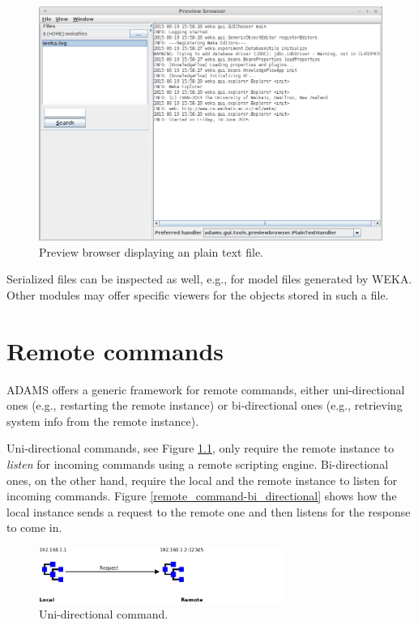 \begin{figure}[htb]
  \centering
  \includegraphics[width=12.0cm]{images/previewbrowser-plaintext1.png}
  \caption{Preview browser displaying an plain text file.}
  \label{previewbrowser-plaintext1}
\end{figure}

Serialized files can be inspected as well, e.g., for model files generated 
by WEKA. Other modules may offer specific viewers for the objects stored
in such a file.


\chapter{Remote commands}

ADAMS offers a generic framework for remote commands, either uni-directional
ones (e.g., restarting the remote instance) or bi-directional ones
(e.g., retrieving system info from the remote instance).

Uni-directional commands, see Figure \ref{remote_command-uni_directional},
only require the remote instance to \textit{listen} for incoming commands
using a remote scripting engine. Bi-directional ones, on the other hand,
require the local and the remote instance to listen for incoming commands.
Figure \ref{remote_command-bi_directional} shows how the local instance
sends a request to the remote one and then listens for the response to
come in.

\begin{figure}[htb]
  \centering
  \includegraphics[width=8.0cm]{images/remote_command-uni_directional.png}
  \caption{Uni-directional command.}
  \label{remote_command-uni_directional}
\end{figure}

